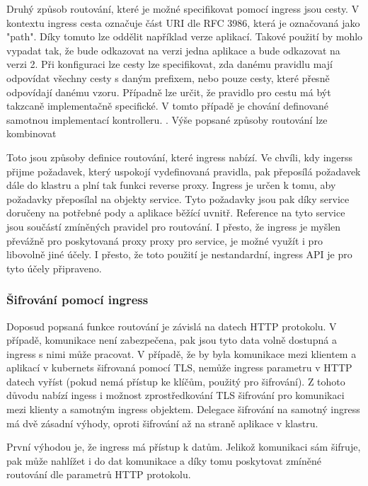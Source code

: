 Druhý způsob routování, které je možné specifikovat pomocí ingress jsou cesty. V kontextu ingress cesta označuje část URI dle RFC 3986, která je označovaná jako "path". Díky tomuto lze oddělit například verze aplikací. Takové použití by mohlo vypadat tak, že  bude odkazovat na verzi jedna aplikace a  bude odkazovat na verzi 2. Při konfiguraci lze cesty lze specifikovat, zda danému pravidlu mají odpovídat všechny cesty s daným prefixem, nebo pouze cesty, které přesně odpovídají danému vzoru. Případně lze určit, že pravidlo pro cestu má být takzcaně implementačně specifické. V tomto případě je chování definované samotnou implementací kontrolleru. \cite{thekubernetesauthors_2022_ingress}. Výše popsané způsoby routování lze kombinovat

Toto jsou způsoby definice routování, které ingress nabízí. Ve chvíli, kdy ingerss přijme požadavek, který uspokojí vydefinovaná pravidla, pak přeposílá požadavek dále do klastru a plní tak funkci reverse proxy. Ingress je určen k tomu, aby požadavky přeposílal na objekty service. Tyto požadavky jsou pak díky service doručeny na potřebné pody a aplikace běžící uvnitř. Reference na tyto service jsou součástí zmíněných pravidel pro routování. I přesto, že ingress je myšlen převážně pro poskytovaná proxy proxy pro service, je možné využít i pro libovolně jiné účely. I přesto, že toto použití je nestandardní, ingress API je pro tyto účely připraveno.   

\subsubsection{Šifrování pomocí ingress}
Doposud popsaná funkce routování je závislá na datech HTTP protokolu. V případě, komunikace není zabezpečena, pak jsou tyto data volně dostupná a ingress s nimi může pracovat. V případě, že by byla komunikace mezi klientem a aplikací v kubernets šifrovaná pomocí TLS, nemůže ingress parametru v HTTP datech vyříst (pokud nemá přístup ke klíčům, použitý pro šifrování). Z tohoto důvodu nabízí ingess i možnost zprostředkování TLS šifrování pro komunikaci mezi klienty a samotným ingress objektem. Delegace šifrování na samotný ingress má dvě zásadní výhody, oproti šifrování až na straně aplikace v klastru. 

První výhodou je, že ingress má přístup k datům. Jelikož komunikaci sám šifruje, pak může nahlížet i do dat komunikace a díky tomu poskytovat zmíněné routování dle parametrů HTTP protokolu.

